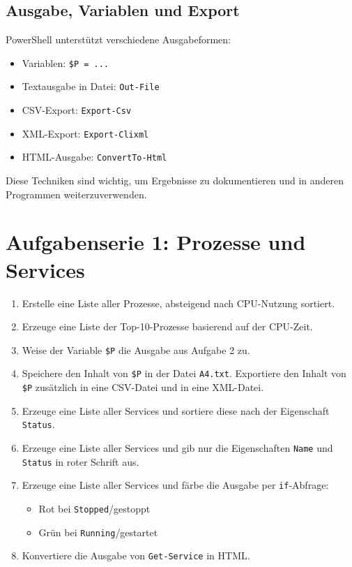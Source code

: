 \documentclass[11pt, oneside, numbers=noenddot]{scrbook}
\begin{document}
\section{Ausgabe, Variablen und Export}
PowerShell unterstützt verschiedene Ausgabeformen:
\begin{itemize}
\item Variablen: \texttt{\$P = ...}
\item Textausgabe in Datei: \texttt{Out-File}
\item CSV-Export: \texttt{Export-Csv}
\item XML-Export: \texttt{Export-Clixml}
\item HTML-Ausgabe: \texttt{ConvertTo-Html}
\end{itemize}

Diese Techniken sind wichtig, um Ergebnisse zu dokumentieren und in anderen Programmen weiterzuverwenden.

\chapter{Aufgabenserie 1: Prozesse und Services}
\begin{enumerate}
\item Erstelle eine Liste aller Prozesse, absteigend nach CPU-Nutzung sortiert.
\item Erzeuge eine Liste der Top-10-Prozesse basierend auf der CPU-Zeit.
\item Weise der Variable \texttt{\$P} die Ausgabe aus Aufgabe 2 zu.
\item Speichere den Inhalt von \texttt{\$P} in der Datei \texttt{A4.txt}. Exportiere den Inhalt von \texttt{\$P} zusätzlich in eine CSV-Datei und in eine XML-Datei.
\item Erzeuge eine Liste aller Services und sortiere diese nach der Eigenschaft \texttt{Status}.
\item Erzeuge eine Liste aller Services und gib nur die Eigenschaften \texttt{Name} und \texttt{Status} in roter Schrift aus.
\item Erzeuge eine Liste aller Services und färbe die Ausgabe per \texttt{if}-Abfrage:
\begin{itemize}
\item Rot bei \texttt{Stopped}/gestoppt
\item Grün bei \texttt{Running}/gestartet
\end{itemize}
\item Konvertiere die Ausgabe von \texttt{Get-Service} in HTML.
\end{enumerate}
\end{document}
